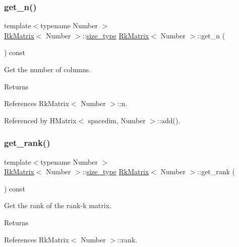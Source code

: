 \subsubsection{\texorpdfstring{get\+\_\+n()}{get\_n()}}
{\footnotesize\ttfamily template$<$typename Number $>$ \\
\hyperlink{classRkMatrix}{Rk\+Matrix}$<$ Number $>$\+::\hyperlink{classRkMatrix_add060bfc3a4cc77f858c3d6dd58cadd5}{size\+\_\+type} \hyperlink{classRkMatrix}{Rk\+Matrix}$<$ Number $>$\+::get\+\_\+n (\begin{DoxyParamCaption}{ }\end{DoxyParamCaption}) const}

Get the number of columns. \begin{DoxyReturn}{Returns}

\end{DoxyReturn}


References Rk\+Matrix$<$ Number $>$\+::n.



Referenced by H\+Matrix$<$ spacedim, Number $>$\+::add().

\mbox{\label{classRkMatrix_a1b2231c1e02862c91f4451e2b0a5fab4}} 
\subsubsection{\texorpdfstring{get\+\_\+rank()}{get\_rank()}}
{\footnotesize\ttfamily template$<$typename Number $>$ \\
\hyperlink{classRkMatrix}{Rk\+Matrix}$<$ Number $>$\+::\hyperlink{classRkMatrix_add060bfc3a4cc77f858c3d6dd58cadd5}{size\+\_\+type} \hyperlink{classRkMatrix}{Rk\+Matrix}$<$ Number $>$\+::get\+\_\+rank (\begin{DoxyParamCaption}{ }\end{DoxyParamCaption}) const}

Get the rank of the rank-\/k matrix. \begin{DoxyReturn}{Returns}

\end{DoxyReturn}


References Rk\+Matrix$<$ Number $>$\+::rank.

\mbox{\label{classRkMatrix_a8894542d0a6cda34a78cccf34eb3f990}} 
